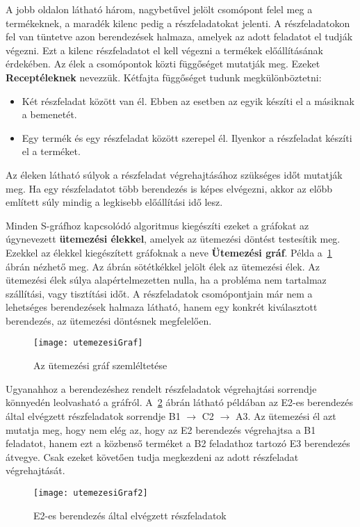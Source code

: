 A jobb oldalon látható három, nagybetűvel jelölt csomópont felel meg a termékeknek, a maradék kilenc pedig a részfeladatokat jelenti.
A részfeladatokon fel van tüntetve azon berendezések halmaza, amelyek az adott feladatot el tudják végezni.
Ezt a kilenc részfeladatot el kell végezni a termékek előállításának érdekében.
Az élek a csomópontok közti függőséget mutatják meg.
Ezeket \textbf{Receptéleknek} nevezzük.
Kétfajta függőséget tudunk megkülönböztetni:
\begin{itemize}
  \item Két részfeladat között van él.
  Ebben az esetben az egyik készíti el a másiknak a bemenetét.
  \item Egy termék és egy részfeladat között szerepel él.
  Ilyenkor a részfeladat készíti el a terméket.
\end{itemize}
Az éleken látható súlyok a részfeladat végrehajtásához szükséges időt mutatják meg.
Ha egy részfeladatot több berendezés is képes elvégezni, akkor az előbb említett súly mindig a legkisebb előállítási idő lesz.

Minden S-gráfhoz kapcsolódó algoritmus kiegészíti ezeket a gráfokat az úgynevezett \textbf{ütemezési élekkel}, amelyek az ütemezési döntést testesítik meg.
Ezekkel az élekkel kiegészített gráfoknak a neve \textbf{Ütemezési gráf}.
Példa a~\ref{utemezesiGraf} ábrán nézhető meg.
Az ábrán sötétkékkel jelölt élek az ütemezési élek.
Az ütemezési élek súlya alapértelmezetten nulla, ha a probléma nem tartalmaz szállítási, vagy tisztítási időt.
A részfeladatok csomópontjain már nem a lehetséges berendezések halmaza látható, hanem egy konkrét kiválasztott berendezés, az ütemezési döntésnek megfelelően. 
\begin{figure}[H]
\begin{center}
\texttt{[image: utemezesiGraf]}
\caption{Az ütemezési gráf szemléltetése}
\label{utemezesiGraf}
\end{center}
\end{figure}

Ugyanahhoz a berendezéshez rendelt részfeladatok végrehajtási sorrendje könnyedén leolvasható a gráfról.
A~\ref{utemezesiGraf2} ábrán látható példában az E2-es berendezés által elvégzett részfeladatok sorrendje B1 $\to$ C2 $\to$ A3.
Az ütemezési él azt mutatja meg, hogy nem elég az, hogy az E2 berendezés végrehajtsa a B1 feladatot, hanem ezt a közbenső terméket a B2 feladathoz tartozó E3 berendezés átvegye.
Csak ezeket követően tudja megkezdeni az adott részfeladat végrehajtását.
\begin{figure}[H]
\begin{center}
\texttt{[image: utemezesiGraf2]}
\caption{E2-es berendezés által elvégzett részfeladatok}
\label{utemezesiGraf2}
\end{center}
\end{figure}

